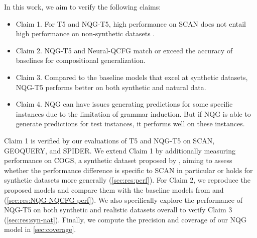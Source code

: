 In this work, we aim to verify the following claims:

\begin{itemize}\setlength\itemsep{0.1mm}
    \item Claim 1. For T5 and NQG-T5, high performance on SCAN does not entail high performance on non-synthetic datasets \cite{shaw-etal-2021-compositional}.
    \item Claim 2. NQG-T5 \cite{shaw-etal-2021-compositional} and Neural-QCFG \cite{kim2021sequencetosequence} match or exceed the accuracy of baselines for compositional generalization.
    \item Claim 3. Compared to the baseline models that excel at synthetic datasets, NQG-T5 performs better on both synthetic and natural data. 
    \item Claim 4. NQG can have issues generating predictions for some specific instances due to the limitation of grammar induction. But if NQG is able to generate predictions for test instances, it performs well on these instances.
\end{itemize}

Claim 1 is verified by our evaluations of T5 and NQG-T5 on SCAN, GEOQUERY, and SPIDER. %
We extend Claim 1 by additionally measuring performance on COGS, a synthetic dataset proposed by \cite{kim-linzen-2020-cogs}, aiming to assess  whether the performance difference is specific to SCAN in particular or holds for synthetic datasets more generally (\cref{sec:res:perf}).
For Claim 2, we reproduce the proposed models and compare them with the baseline models from \cite{shaw-etal-2021-compositional} and \cite{kim2021sequencetosequence} (\cref{sec:res:NQG-NQCFG-perf}).
We also specifically explore the performance of NQG-T5 on both synthetic and realistic datasets overall to verify Claim 3 (\cref{sec:res:syn-nat}).
Finally, we compute the precision and coverage of our NQG model in \cref{sec:coverage}.